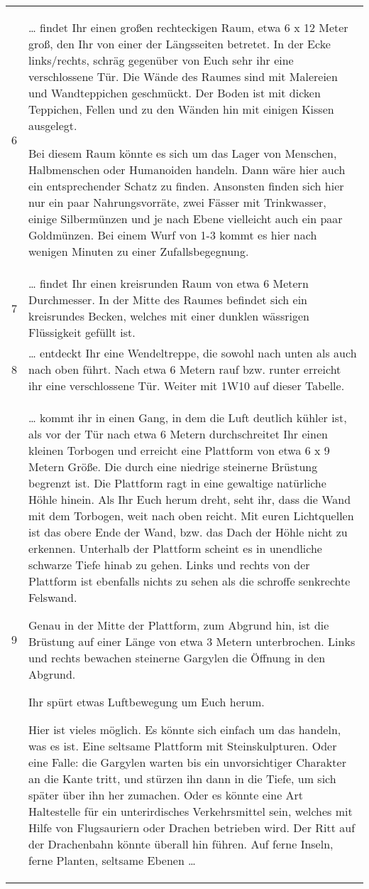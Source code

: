 \documentclass[11pt]{wbzine}
\begin{document}
\begin{tabularx}{\columnwidth}{cZ}
6 & 
  \ldots{} findet Ihr einen großen rechteckigen Raum, etwa 6 x 12 Meter
  groß, den Ihr von einer der Längsseiten betretet. In der Ecke
  links/rechts, schräg gegenüber von Euch sehr ihr eine verschlossene
  Tür. Die Wände des Raumes sind mit Malereien und Wandteppichen
  geschmückt. Der Boden ist mit dicken Teppichen, Fellen und zu den
  Wänden hin mit einigen Kissen ausgelegt.

  Bei diesem Raum könnte es sich um das Lager von Menschen, Halbmenschen
  oder Humanoiden handeln. Dann wäre hier auch ein entsprechender Schatz
  zu finden. Ansonsten finden sich hier nur ein paar Nahrungsvorräte,
  zwei Fässer mit Trinkwasser, einige Silbermünzen und je nach Ebene
  vielleicht auch ein paar Goldmünzen. Bei einem Wurf von 1-3 kommt es
  hier nach wenigen Minuten zu einer Zufallsbegegnung.
\\
7 & 
  \ldots{} findet Ihr einen kreisrunden Raum von etwa 6 Metern
  Durchmesser. In der Mitte des Raumes befindet sich ein kreisrundes
  Becken, welches mit einer dunklen wässrigen Flüssigkeit gefüllt ist.
\\
8 & 
  \ldots{} entdeckt Ihr eine Wendeltreppe, die sowohl nach unten als
  auch nach oben führt. Nach etwa 6 Metern rauf bzw. runter erreicht ihr
  eine verschlossene Tür. Weiter mit 1W10 auf dieser Tabelle.
\\
9 & 
  \ldots{} kommt ihr in einen Gang, in dem die Luft deutlich kühler ist,
  als vor der Tür nach etwa 6 Metern durchschreitet Ihr einen kleinen
  Torbogen und erreicht eine Plattform von etwa 6 x 9 Metern Größe. Die
  durch eine niedrige steinerne Brüstung begrenzt ist. Die Plattform
  ragt in eine gewaltige natürliche Höhle hinein. Als Ihr Euch herum
  dreht, seht ihr, dass die Wand mit dem Torbogen, weit nach oben
  reicht. Mit euren Lichtquellen ist das obere Ende der Wand, bzw. das
  Dach der Höhle nicht zu erkennen. Unterhalb der Plattform scheint es
  in unendliche schwarze Tiefe hinab zu gehen. Links und rechts von der
  Plattform ist ebenfalls nichts zu sehen als die schroffe senkrechte
  Felswand.

  Genau in der Mitte der Plattform, zum Abgrund hin, ist die Brüstung
  auf einer Länge von etwa 3 Metern unterbrochen. Links und rechts
  bewachen steinerne Gargylen die Öffnung in den Abgrund.

  Ihr spürt etwas Luftbewegung um Euch herum.

  Hier ist vieles möglich. Es könnte sich einfach um das handeln, was es
  ist. Eine seltsame Plattform mit Steinskulpturen. Oder eine Falle: die
  Gargylen warten bis ein unvorsichtiger Charakter an die Kante tritt,
  und stürzen ihn dann in die Tiefe, um sich später über ihn her
  zumachen. Oder es könnte eine Art Haltestelle für ein unterirdisches
  Verkehrsmittel sein, welches mit Hilfe von Flugsauriern oder Drachen
  betrieben wird. Der Ritt auf der Drachenbahn könnte überall hin
  führen. Auf ferne Inseln, ferne Planten, seltsame Ebenen \ldots{}
\\
\end{tabularx}
\end{document}
